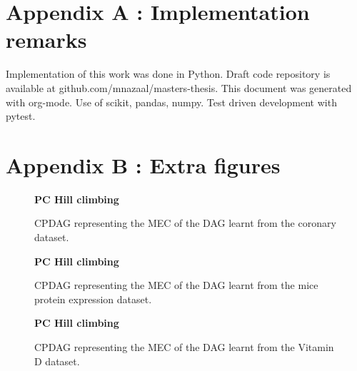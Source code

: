 \documentclass{tufte-book}
\begin{document}
\begin{Definition}



 \newpage 

\chapter{Appendix A : Implementation remarks}
\label{sec:org89bbbf7}
Implementation of this work was done in Python. Draft code repository is available at github.com/mnazaal/masters-thesis. This document was generated with org-mode. Use of scikit, pandas, numpy. Test driven development with pytest.


\chapter{Appendix B : Extra figures}
\label{sec:orga4a2c9a}
\begin{figure}
   \begin{floatrow}
   \centering
   \textbf{\hspace{5mm}PC \hspace{60mm} Hill climbing }\par\medskip
{}%
\hfill
{}
   \end{floatrow}
   \caption{CPDAG representing the MEC of the DAG learnt from the coronary dataset.}
\end{figure}

\begin{figure}
   \begin{floatrow}
   \centering
   \textbf{\hspace{5mm}PC \hspace{60mm} Hill climbing }\par\medskip
{}%
\hfill
{}
   \end{floatrow}
   \caption{CPDAG representing the MEC of the DAG learnt from the mice protein expression dataset.}
\end{figure}


\begin{figure}
   \begin{floatrow}
   \centering
   \textbf{\hspace{5mm}PC \hspace{60mm} Hill climbing }\par\medskip
{}%
\hfill
{}
   \end{floatrow}
   \caption{CPDAG representing the MEC of the DAG learnt from the Vitamin D dataset.}
\end{figure}




\end{Definition}
\end{document}

